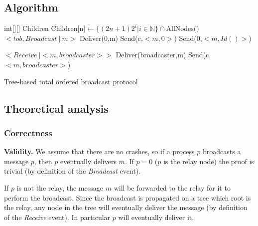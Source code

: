\documentclass[a4paper]{article}
\begin{document}
\subsection{Algorithm}
\begin{algorithm}[H]
    \centering
    \begin{algorithmic}[5]
        \Data
        \State int[][] Children
        \EndData
        \Init
        \State Children[n]$\gets\{(2n + 1)2^i | i \in \mathbb{N}\} \cap \text{AllNodes()}$
        \EndFor
        \EndInit
        \Event $< tob,Broadcast\ |\ m> $
        \State Deliver(0,m)
        \State Send(c,$<m,0>$)
        \EndFor
        \Else
        \State Send(0,$<m,Id()>$)
        \EndIf
        \EndEvent

        \Event $<Receive\ | <m,broadcaster>>$
        \State Deliver(broadcaster,m)
        \State Send(c,$<m,broadcaster>$)
        \EndFor
        \EndEvent
    \end{algorithmic}
    \caption{Tree-based total ordered broadcast protocol}
\end{algorithm}

\subsection{Theoretical analysis}
\subsubsection{Correctness}
\noindent\textbf{Validity.} We assume that there are no crashes, so if a
process $p$ broadcasts a message $p$, then $p$ eventually delivers $m$. If
$p = 0$ ($p$ is the relay node) the proof is trivial (by definition of the
\textit{Broadcast} event).

If $p$ is not the relay, the message $m$ will be forwarded to the  relay for
it to perform the broadcast. Since the broadcast is propagated on a tree which
root is the relay, any node in the tree will eventually deliver the message
(by definition of the \textit{Receive} event). In particular $p$ will
eventually deliver it.
\end{document}
